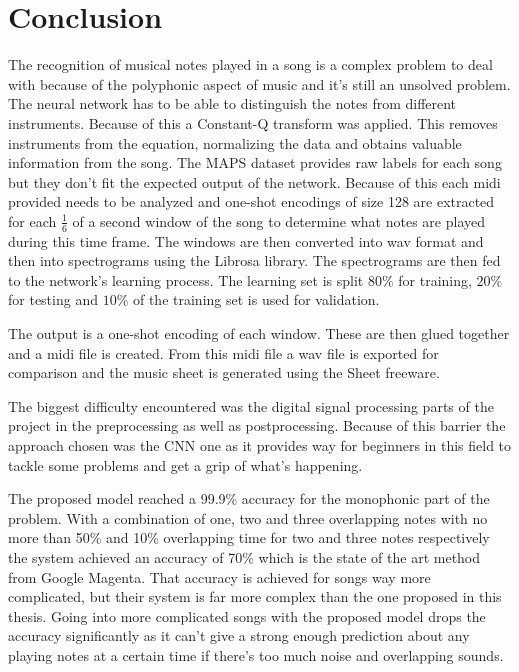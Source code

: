 \newpage
\section{Conclusion}

The recognition of musical notes played in a song is a complex problem to deal with because of the polyphonic aspect of music and it's still an unsolved problem. The neural network has to be able to distinguish the notes from different instruments. Because of this a Constant-Q transform was applied. This removes instruments from the equation, normalizing the data and obtains valuable information from the song. The MAPS dataset \cite{maps} provides raw labels for each song but they don't fit the expected output of the network. Because of this each midi provided needs to be analyzed and one-shot encodings of size 128 are extracted for each $\frac{1}{6}$ of a second window of the song to determine what notes are played during this time frame. The windows are then converted into wav format and then into spectrograms using the Librosa \cite{librosa} library. The spectrograms are then fed to the network's learning process. The learning set is split $80\%$ for training, $20\%$ for testing and $10\%$ of the training set is used for validation.

\par
The output is a one-shot encoding of each window. These are then glued together and a midi file is created. From this midi file a wav file is exported for comparison and the music sheet is generated using the Sheet freeware. \cite{sheet}

\par
The biggest difficulty encountered was the digital signal processing parts of the project in the preprocessing as well as postprocessing. Because of this barrier the approach chosen was the CNN one as it provides way for beginners in this field to tackle some problems and get a grip of what's happening. 

\par
The proposed model reached a 99.9\% accuracy for the monophonic part of the problem. With a combination of one, two and three overlapping notes with no more than 50\% and 10\% overlapping time for two and three notes respectively the system achieved an accuracy of 70\% which is the state of the art method from Google Magenta. That accuracy is achieved for songs way more complicated, but their system is far more complex than the one proposed in this thesis. Going into more complicated songs with the proposed model drops the accuracy significantly as it can't give a strong enough prediction about any playing notes at a certain time if there's too much noise and overlapping sounds.

